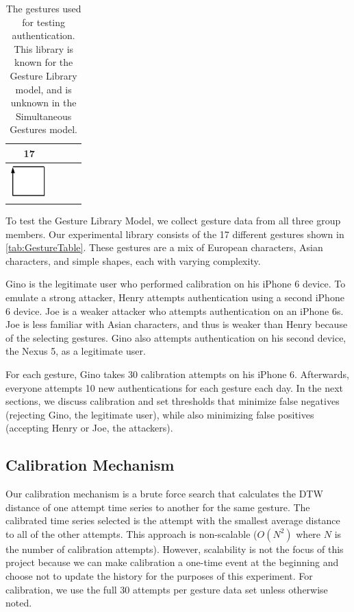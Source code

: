 \begin{table}
\begin{center}
\begin{tabular}{ c | c | c | c  }
    17    \\ \hline
    \includegraphics[width=0.2\linewidth, height=13mm]{./figures/gesture_17.png} \\ \hline
  \end{tabular}
\end{center}
\caption{The gestures used for testing authentication. This library is known for the Gesture Library model, and is unknown in the Simultaneous Gestures model.} %
\label{tab:GestureTable}
\end{table}


To test the Gesture Library Model, we collect gesture data from all three group members. Our experimental library consists of the 17 different gestures shown in \autoref{tab:GestureTable}. These gestures are a mix of European characters, Asian characters, and simple shapes, each with varying complexity. 

Gino is the legitimate user who performed calibration on his iPhone 6 device. To emulate a strong attacker, Henry attempts authentication using a second iPhone 6 device. Joe is a weaker attacker who attempts authentication on an iPhone 6s. Joe is less familiar with Asian characters, and thus is weaker than Henry because of the selecting gestures. Gino also attempts authentication on his second device, the Nexus 5, as a legitimate user.

For each gesture, Gino takes 30 calibration attempts on his iPhone 6. Afterwards, everyone attempts 10 new authentications for each gesture each day. In the next sections, we discuss calibration and set thresholds that minimize false negatives (rejecting Gino, the legitimate user), while also minimizing false positives (accepting Henry or Joe, the attackers).

\subsection{Calibration Mechanism}

Our calibration mechanism is a brute force search that calculates the \gls{DTW} distance of one attempt time series to another for the same gesture. The calibrated time series selected is the attempt with the smallest average distance to all of the other attempts. This approach is non-scalable ($O(N^{2})$ where $N$ is the number of calibration attempts). However, scalability is not the focus of this project because we can make calibration a one-time event at the beginning and choose not to update the history for the purposes of this experiment. For calibration, we use the full 30 attempts per gesture data set unless otherwise noted.

